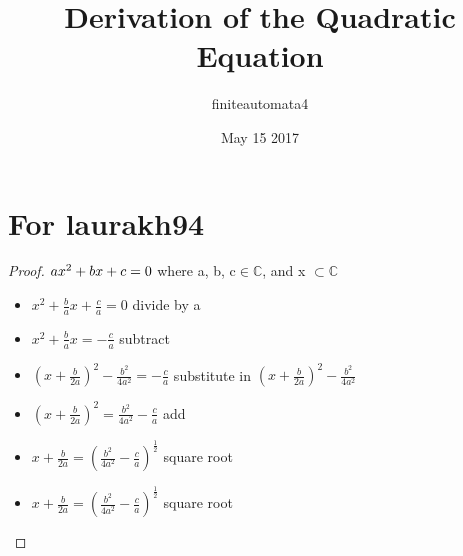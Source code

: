 \documentclass{article}
\title{Derivation of the Quadratic Equation}
\author{ finiteautomata4 }
\date{May 15 2017}
\theoremstyle{definition}
\theoremstyle{plain}
\begin{document}
\maketitle

\section{For laurakh94}

\begin{proof}
  $\newline ax^{2}+bx+c = 0$ where a, b, c$\in \mathbb{C}$, and x $\subset \mathbb{C}$

  \begin{itemize}
  \item $x^{2} + \frac{b}{a}x + \frac{c}{a} = 0$  divide by a
  \item $x^{2} + \frac{b}{a}x = -\frac{c}{a}$  subtract
  \item $(x + \frac{b}{2a})^{2}  - \frac{b^{2}}{4a^{2}} = -\frac{c}{a}$ substitute in $(x + \frac{b}{2a})^{2} - \frac{b^{2}}{4a^{2}}$ 
  \item $(x + \frac{b}{2a})^{2} = \frac{b^{2}}{4a^{2}} - \frac{c}{a}$  add
  \item $x + \frac{b}{2a} = (\frac{b^{2}}{4a^{2}} - \frac{c}{a} )^{\frac{1}{2}}$  square root
  \item $x + \frac{b}{2a} = (\frac{b^{2}}{4a^{2}} - \frac{c}{a} )^{\frac{1}{2}}$  square root
  \qedhere
  \end{itemize}
\end{proof}




\end{document}

